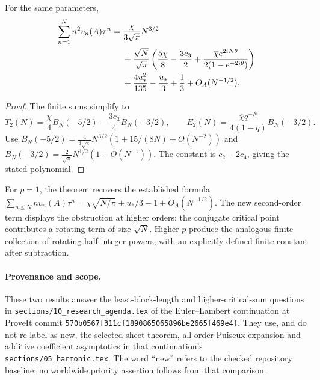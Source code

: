 \begin{corollary}
\label{newdiag:cor:p2}
For the same parameters,
\begin{align}
 \sum_{n=1}^N n^2v_n(A)\tau^n
 ={}&\frac{\chi}{3\sqrt\pi}N^{3/2}\notag\\
 &+\frac{\sqrt N}{\sqrt\pi}
   \left(\frac{5\chi}{8}-\frac{3c_3}{2}
       +\frac{\overline\chi e^{2iN\theta}}
                    {2(1-e^{-2i\theta})}\right)\notag\\
 &+\frac{4u_*^2}{135}-\frac{u_*}{3}+\frac13
       +O_A(N^{-1/2}).\label{newdiag:eq:p2}
\end{align}
\end{corollary}

\begin{proof}
The finite sums simplify to
\[
 T_2(N)=\frac\chi4 B_N(-5/2)-\frac{3c_3}4B_N(-3/2),
 \qquad
 E_2(N)=\frac{\overline\chi q^{-N}}{4(1-q)}B_N(-3/2).
\]
Use
$B_N(-5/2)=\frac4{3\sqrt\pi}N^{3/2}
 (1+15/(8N)+O(N^{-2}))$ and
$B_N(-3/2)=\frac2{\sqrt\pi}N^{1/2}(1+O(N^{-1}))$.
The constant is $c_2-2c_4$, giving the stated polynomial.
\end{proof}

For $p=1$, the theorem recovers the established formula
$\sum_{n\leq N}nv_n(A)\tau^n
=\chi\sqrt{N/\pi}+u_*/3-1+O_A(N^{-1/2})$.
The new second-order term displays the obstruction at higher orders:
the conjugate critical point contributes a rotating term of size
$\sqrt N$.  Higher $p$ produce the analogous finite collection of
rotating half-integer powers, with an explicitly defined finite
constant after subtraction.

\paragraph{Provenance and scope.}
These two results answer the least-block-length and higher-critical-sum
questions in
\texttt{sections/10\_research\_agenda.tex} of the Euler--Lambert continuation \cite{RepoLerch}
at ProveIt commit
\texttt{570b0567f311cf1890865065896be2665f469e4f}.
They use, and do not re-label as new, the selected-sheet theorem,
all-order Puiseux expansion and additive coefficient asymptotics in
that continuation's \texttt{sections/05\_harmonic.tex}.
The word ``new'' refers to the checked repository baseline;
no worldwide priority assertion follows from that comparison.
